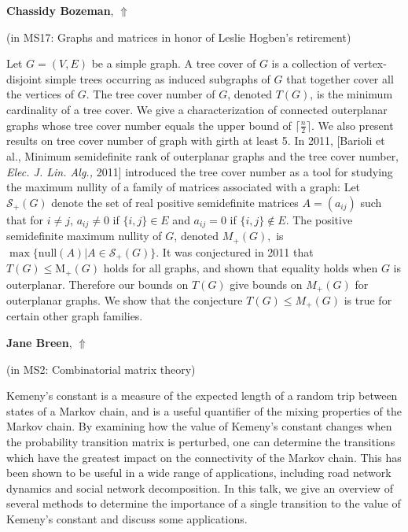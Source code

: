 \documentclass[ILAS2025-program.tex]{subfiles}
\begin{document}
\hypertarget{down0222}{}\begin{ilasabstract}
    
\textbf{Chassidy Bozeman},  \hfill \hyperlink{up0222}{$\Uparrow$}
    
    
(in {\color{mstitle}MS17: Graphs and matrices in honor of Leslie Hogben's retirement})
        
\mtskip
    Let $G=(V,E)$ be  a simple graph. A tree cover of $G$ is a collection of  vertex-disjoint simple trees occurring as induced subgraphs of $G$ that together cover all the vertices of $G$. The tree cover number of $G$, denoted $T(G)$, is the minimum cardinality of a tree cover. We give a characterization of connected outerplanar graphs whose tree cover number equals the upper bound of $\lceil \frac{n}{2} \rceil$.  We also present results on tree cover number of graph with girth at least 5. In 2011, [Barioli et al., Minimum semidefinite rank of outerplanar graphs and the tree cover number, {\em Elec. J. Lin. Alg.,} 2011] introduced the tree cover number as a tool for studying the maximum nullity of a family of matrices associated with a graph:  Let $\mathcal{S}_+(G)$ denote the set of real positive semidefinite matrices $A=(a_{ij})$ such that for $i\neq j$, $a_{ij}\neq 0$ if $\{i,j\}\in E$ and $a_{ij}=0$ if $\{i,j\}\notin E$. The positive semidefinite maximum  nullity of $G$, denoted $M_+(G),$ is $\max\{\text{null}(A)|A\in \mathcal{S}_+(G)\}.$ It was conjectured in 2011 that $T(G) \le \mathrm{M}_+(G)$ holds for all graphs, and shown that equality holds when $G$ is outerplanar.  Therefore our bounds on $T(G)$ give bounds on $M_+(G)$ for outerplanar graphs. We show that the conjecture $T(G)\leq M_+(G)$ is true for certain other graph families.

\end{ilasabstract}
    

\hypertarget{down0032}{}\begin{ilasabstract}
    
\textbf{Jane Breen},  \hfill \hyperlink{up0032}{$\Uparrow$}
    
    
(in {\color{mstitle}MS2: Combinatorial matrix theory})
        
\mtskip
    Kemeny's constant is a measure of the expected length of a random trip between states of a Markov chain, and is a useful quantifier of the mixing properties of the Markov chain. By examining how the value of Kemeny's constant changes when the probability transition matrix is perturbed, one can determine the transitions which have the greatest impact on the connectivity of the Markov chain. This has been shown to be useful in a wide range of applications, including road network dynamics and social network decomposition. In this talk, we give an overview of several methods to determine the importance of a single transition to the value of Kemeny's constant and discuss some applications.

\end{ilasabstract}
    
\end{document}
